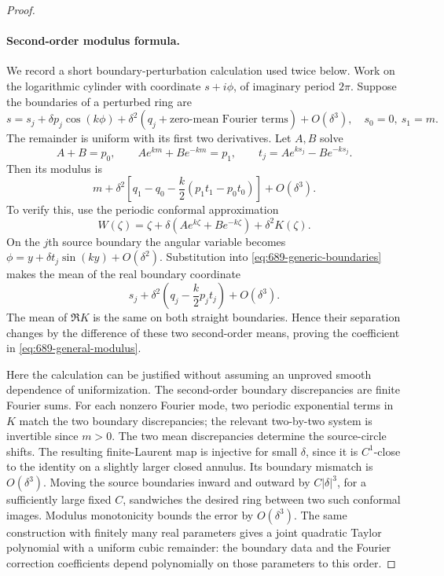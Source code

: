 \documentclass[11pt,a4paper]{article}
\theoremstyle{remark}
\begin{document}
\begin{proof}
\paragraph{Second-order modulus formula.}
We record a short boundary-perturbation calculation used twice below. Work on the logarithmic cylinder with coordinate $s+i\phi$, of imaginary period $2\pi$. Suppose the boundaries of a perturbed ring are
\begin{equation}
 s=s_j+\delta p_j\cos(k\phi)
       +\delta^2(q_j+\text{zero-mean Fourier terms})+O(\delta^3),
 \quad s_0=0,\ s_1=m.
 \label{eq:689-generic-boundaries}
\end{equation}
The remainder is uniform with its first two derivatives. Let $A,B$ solve
\begin{equation}
 A+B=p_0,\qquad Ae^{km}+Be^{-km}=p_1,
 \qquad t_j=Ae^{ks_j}-Be^{-ks_j}.
 \label{eq:689-first-order-constants}
\end{equation}
Then its modulus is
\begin{equation}
 m+\delta^2\left[q_1-q_0-\frac{k}{2}(p_1t_1-p_0t_0)\right]+O(\delta^3).
 \label{eq:689-general-modulus}
\end{equation}
To verify this, use the periodic conformal approximation
\[
 W(\zeta)=\zeta+\delta(Ae^{k\zeta}+Be^{-k\zeta})+\delta^2K(\zeta).
\]
On the $j$th source boundary the angular variable becomes
$\phi=y+\delta t_j\sin(ky)+O(\delta^2)$. Substitution into
\eqref{eq:689-generic-boundaries} makes the mean of the real boundary coordinate
\[
 s_j+\delta^2\left(q_j-\frac{k}{2}p_jt_j\right)+O(\delta^3).
\]
The mean of $\Re K$ is the same on both straight boundaries. Hence their separation changes by the difference of these two second-order means, proving the coefficient in \eqref{eq:689-general-modulus}.

Here the calculation can be justified without assuming an unproved smooth dependence of uniformization. The second-order boundary discrepancies are finite Fourier sums. For each nonzero Fourier mode, two periodic exponential terms in $K$ match the two boundary discrepancies; the relevant two-by-two system is invertible since $m>0$. The two mean discrepancies determine the source-circle shifts. The resulting finite-Laurent map is injective for small $\delta$, since it is $C^1$-close to the identity on a slightly larger closed annulus. Its boundary mismatch is $O(\delta^3)$. Moving the source boundaries inward and outward by $C|\delta|^3$, for a sufficiently large fixed $C$, sandwiches the desired ring between two such conformal images. Modulus monotonicity bounds the error by $O(\delta^3)$. The same construction with finitely many real parameters gives a joint quadratic Taylor polynomial with a uniform cubic remainder: the boundary data and the Fourier correction coefficients depend polynomially on those parameters to this order.


\end{proof}
\end{document}

